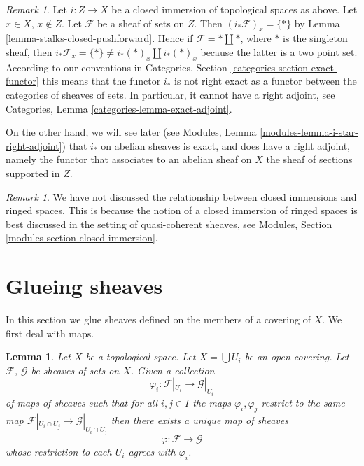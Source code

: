 \documentclass{stacks-project}
\theoremstyle{plain}
\newtheorem{lemma}[subsection]{Lemma}
\theoremstyle{definition}
\theoremstyle{remark}
\newtheorem{remark}[subsection]{Remark}
\numberwithin{equation}{subsection}
\begin{document}
\begin{remark}
\label{remark-i-star-not-exact}
Let $i : Z \to X$ be a closed immersion of topological spaces as above.
Let $x \in X$, $x \not \in Z$. Let $\mathcal{F}$ be a sheaf of sets
on $Z$. Then $(i_*\mathcal{F})_x = \{ * \}$
by Lemma \ref{lemma-stalks-closed-pushforward}.
Hence if $\mathcal{F} = * \amalg *$, where
$*$ is the singleton sheaf, then
$i_*\mathcal{F}_x = \{*\} \not = i_*(*)_x \amalg i_*(*)_x$
because the latter is a two point set.
According to our conventions in
Categories, Section \ref{categories-section-exact-functor}
this means that the functor $i_*$ is not right exact
as a functor between the categories of sheaves of sets.
In particular, it cannot have a right adjoint, see
Categories, Lemma \ref{categories-lemma-exact-adjoint}.

\medskip\noindent
On the other hand, we will see later (see
Modules, Lemma \ref{modules-lemma-i-star-right-adjoint})
that $i_*$ on abelian sheaves is exact, and does have a right
adjoint, namely the functor that associates to an abelian sheaf on $X$
the sheaf of sections supported in $Z$.
\end{remark}

\begin{remark}
\label{remark-closed-immersion-spaces}
We have not discussed the relationship between closed immersions
and ringed spaces. This is because the notion of a closed immersion
of ringed spaces is best discussed in the setting of quasi-coherent
sheaves, see Modules, Section \ref{modules-section-closed-immersion}.
\end{remark}

\section{Glueing sheaves}
\label{section-glueing-sheaves}

\noindent
In this section we glue sheaves defined on the members of a covering of $X$.
We first deal with maps.

\begin{lemma}
\label{lemma-glue-maps}
Let $X$ be a topological space.
Let $X = \bigcup U_i$ be an open covering.
Let $\mathcal{F}$, $\mathcal{G}$ be sheaves of sets on $X$.
Given a collection
$$
\varphi_i :
\mathcal{F}|_{U_i}
\longrightarrow
\mathcal{G}|_{U_i}
$$
of maps of sheaves such that for all $i, j \in I$ the maps
$\varphi_i, \varphi_j$ restrict to the same map
$\mathcal{F}|_{U_i \cap U_j} \to \mathcal{G}|_{U_i \cap U_j}$
then there exists a unique map of sheaves
$$
\varphi :
\mathcal{F}
\longrightarrow
\mathcal{G}
$$
whose restriction to each $U_i$ agrees with $\varphi_i$.
\end{lemma}
\end{document}
